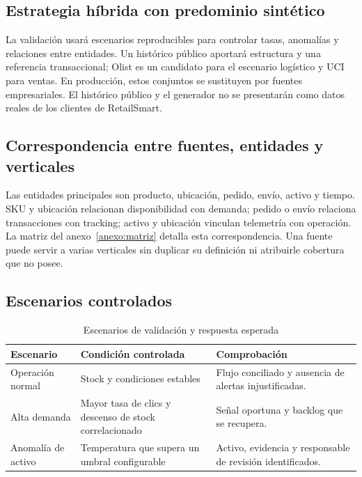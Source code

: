 \documentclass[11pt,a4paper]{article}
\begin{document}
\subsection{Estrategia híbrida con predominio sintético}
La validación usará escenarios reproducibles para controlar tasas, anomalías y relaciones entre entidades. Un histórico público aportará estructura y una referencia transaccional; Olist es un candidato para el escenario logístico y UCI para ventas. En producción, estos conjuntos se sustituyen por fuentes empresariales. El histórico público y el generador no se presentarán como datos reales de los clientes de RetailSmart.
\LuminaFuentes

\subsection{Correspondencia entre fuentes, entidades y verticales}
Las entidades principales son producto, ubicación, pedido, envío, activo y tiempo. SKU y ubicación relacionan disponibilidad con demanda; pedido o envío relaciona transacciones con tracking; activo y ubicación vinculan telemetría con operación. La matriz del anexo~\ref{anexo:matriz} detalla esta correspondencia. Una fuente puede servir a varias verticales sin duplicar su definición ni atribuirle cobertura que no posee.

\subsection{Escenarios controlados}
\begin{table}[H]
\caption{Escenarios de validación y respuesta esperada}\label{tab:escenarios}
\small\begin{tabularx}{\linewidth}{@{}P{.21\linewidth}YY@{}}\toprule
Escenario & Condición controlada & Comprobación\\\midrule
Operación normal & Stock y condiciones estables & Flujo conciliado y ausencia de alertas injustificadas.\\
Alta demanda & Mayor tasa de clics y descenso de stock correlacionado & Señal oportuna y backlog que se recupera.\\
Anomalía de activo & Temperatura que supera un umbral configurable & Activo, evidencia y responsable de revisión identificados.\\\bottomrule
\end{tabularx}
\end{table}
\end{document}
